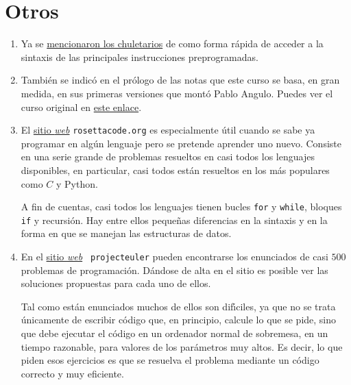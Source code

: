 \section{Otros}
 \begin{enumerate}
  \item Ya se \hyperref[chuletas]{mencionaron los chuletarios} de {\sage} como
forma r\'apida de acceder a la sintaxis de las principales instrucciones
preprogramadas. 
\item Tambi\'en se indic\'o en el pr\'ologo de las notas que este curso se basa,
en gran medida, en sus primeras versiones que mont\'o Pablo Angulo. Puedes ver 
el curso original en 
  \href{http://verso.mat.uam.es/~pablo.angulo/doc/laboratorio/index.html}{este
enlace}. 


  
  
  \item El \href{http://rosettacode.org/wiki/Rosetta_Code}{sitio {\itshape web}}
{\tt rosettacode.org} es especialmente \'util cuando se sabe ya programar en
alg\'un lenguaje pero se pretende aprender uno nuevo. Consiste en una serie
grande de problemas resueltos en casi todos los lenguajes disponibles,  en
particular, casi todos est\'an resueltos en los m\'as populares como $C$ y
Python.

A fin de cuentas, casi todos los lenguajes tienen bucles \lstinline|for| y
\lstinline|while|, bloques \lstinline|if| y recursi\'on. Hay entre ellos
peque\~nas diferencias en la sintaxis y en la forma en que se manejan las
estructuras de datos. 
  
  \item En el \href{http://projecteuler.net/}{sitio {\itshape web}} {\tt
projecteuler} pueden encontrarse los enunciados de casi $500$ problemas de
programaci\'on. D\'andose de alta en el sitio es posible ver las soluciones
propuestas para cada uno de ellos.  

Tal como est\'an enunciados muchos de ellos son dif\'{\i}ciles, ya que no se
trata \'unicamente de escribir c\'odigo que, en principio, calcule lo que se
pide, sino que debe ejecutar el c\'odigo en un ordenador normal de sobremesa, 
en un tiempo razonable, para valores de los par\'ametros muy altos. Es decir, lo
que piden esos ejercicios es que se resuelva el problema mediante un c\'odigo
correcto y muy eficiente. 

  
  
  
  \end{enumerate}

 
 
 
 
 

 
 
 